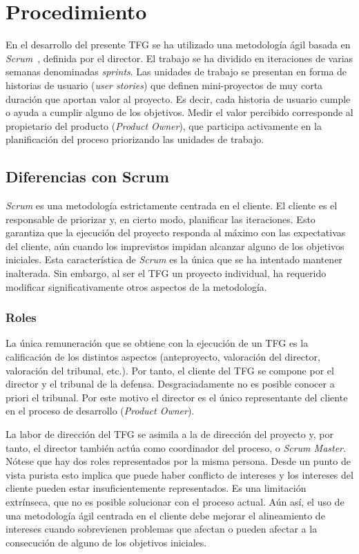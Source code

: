 \chapter{Procedimiento}
\label{ch:procedimiento}

En el desarrollo del presente TFG se ha utilizado una metodología ágil basada en \emph{Scrum}~\cite{scrumguide}, definida por el director. El trabajo se ha dividido en iteraciones de varias semanas denominadas \emph{sprints}. Las unidades de trabajo se presentan en forma de historias de usuario (\emph{user stories}) que definen mini-proyectos de muy corta duración que aportan valor al proyecto.  Es decir, cada historia de usuario cumple o ayuda a cumplir alguno de los objetivos. Medir el valor percibido corresponde al propietario del producto (\emph{Product Owner}), que participa activamente en la planificación del proceso priorizando las unidades de trabajo.


\section{Diferencias con Scrum}
\emph{Scrum} es una metodología estrictamente centrada en el cliente. El cliente es el responsable de priorizar y, en cierto modo, planificar las iteraciones. Esto garantiza que la ejecución del proyecto responda al máximo con las expectativas del cliente, aún cuando los imprevistos impidan alcanzar alguno de los objetivos iniciales. Esta característica de \emph{Scrum} es la única que se ha intentado mantener inalterada. Sin embargo, al ser el TFG un proyecto individual, ha requerido modificar significativamente otros aspectos de la metodología.

\subsection{Roles}
La única remuneración que se obtiene con la ejecución de un TFG es la calificación de los distintos aspectos (anteproyecto, valoración del director, valoración del tribunal, etc.). Por tanto, el cliente del TFG se compone por el director y el tribunal de la defensa. Desgraciadamente no es posible conocer a priori el tribunal. Por este motivo el director es el único representante del cliente en el proceso de desarrollo (\emph{Product Owner}).

La labor de dirección del TFG se asimila a la de dirección del proyecto y, por tanto, el director también actúa como coordinador del proceso, o \emph{Scrum Master}. Nótese que hay dos roles representados por la misma persona. Desde un punto de vista purista esto implica que puede haber conflicto de intereses y los intereses del cliente pueden estar insuficientemente representados. Es una limitación extrínseca, que no es posible solucionar con el proceso actual. Aún así, el uso de una metodología ágil centrada en el cliente debe mejorar el alineamiento de intereses cuando sobrevienen problemas que afectan o pueden afectar a la consecución de alguno de los objetivos iniciales.

